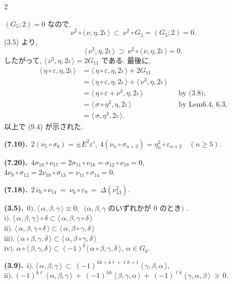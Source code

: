 \documentclass[10pt, leqno]{ltjsarticle}
\newcommand{\todas}[1]{\langle\,#1\,\rangle}
\numberwithin{equation}{section}
\theoremstyle{plain}
\theoremstyle{definition}
\theoremstyle{remark}
\begin{document}
\begin{paracol}{2}

\noindent
\((G_{5};2)=0\) なので, 
\[
\nu^{2}\circ\todas{\nu,\eta,2\iota}\ \subset\ \nu^{2}\circ G_{5}=(G_{5};2)=0.
\]
(3.5) より, 
\[
\todas{\nu^{3},\eta,2\iota}\ \supset\ \nu^{2}\circ\todas{\nu,\eta,2\iota}=0.
\]
したがって,  \(\todas{\nu^{3},\eta,2\iota}=2G_{11}\) である. 最後に,
\[
\begin{align}
\todas{\eta\circ\varepsilon,\eta,2\iota}
&=\todas{\eta\circ\varepsilon,\eta,2\iota}+2G_{11}\\
&=\todas{\eta\circ\varepsilon,\eta,2\iota}+\todas{\nu^{3},\eta,2\iota}\\
&=\todas{\eta\circ\varepsilon + \nu^3, \eta, 2\iota}
&& \text{by (3.8),}\\
& =\todas{\sigma\circ\eta^{2},\eta,2\iota}
&& \text{by Lem6.4, 6.3,}\\
&=\todas{\sigma,\eta^{3},2\iota}.
\end{align}
\]
以上で (9.4) が示された. 

\switchcolumn

\noindent
\textbf{(7.10).}\
\(2(\nu_{5}\circ\sigma_{8})=\pm E^{2}\varepsilon',\
4(\nu_{n}\circ\sigma_{n+3})=\eta_{n}^{2}\circ\varepsilon_{n+2}\quad(n\ge5).\)

\noindent
\textbf{(7.20).}\
\(4\sigma_{10}\circ\nu_{17}
=2\sigma_{11}\circ\nu_{18}
=\sigma_{12}\circ\nu_{19}=0,\)\\
\(4\nu_{9}\circ\sigma_{12}
=2\nu_{10}\circ\sigma_{13}
=\nu_{11}\circ\sigma_{14}=0.\)

\noindent
\textbf{(7.18).}\
\(2\,\overline{\nu}_{6}\circ \nu_{14}
\ =\ \nu_{6}\circ\varepsilon_{9}
\ =\ \Delta(\nu_{13}^{2}).\)

\noindent
\textbf{(3.5).}\
\(\text{0).}\ \todas{\alpha, \beta, \gamma}\equiv 0,
\ \text{ ($\alpha,\beta,\gamma$ のいずれかが $0$ のとき) }\).\\
\(\text{i).}\ \todas{\alpha, \beta, \gamma}\circ\delta
\subset \todas{\alpha, \beta, \gamma\circ\delta}\)\\
\(\text{ii).}\ \todas{\alpha, \beta, \gamma\circ\delta}
\subset \todas{\alpha, \beta\circ\gamma, \delta}\)\\
\(\text{iii).}\ \todas{\alpha\circ\beta, \gamma, \delta}
\subset \todas{\alpha, \beta\circ\gamma, \delta}\)\\
\(\text{iv).}\ \alpha\circ\todas{\beta, \gamma, \delta}
\subset (-1)^k\todas{\alpha\circ\beta, \gamma, \delta},\ \alpha\in G_k .\)

\noindent
\textbf{(3.9).}\
\(\text{i).}\ \todas{\alpha,\beta,\gamma}\ \subset\
(-1)^{hk+k\ell+\ell h+1}\ \todas{\gamma,\beta,\alpha},\)\\
\(\text{ii).}\ (-1)^{k\ell}\ \todas{\alpha,\beta,\gamma}\ +\
(-1)^{hk}\ \todas{\beta,\gamma,\alpha}\ +\
(-1)^{\ell k}\ \todas{\gamma,\alpha,\beta}\ \ni\ 0 .\)


\end{paracol}
\end{document}
